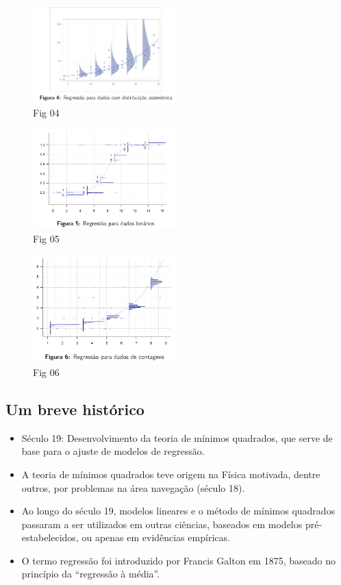 \documentclass[
]{article}
\providecommand{\tightlist}{%
  \setlength{\itemsep}{0pt}\setlength{\parskip}{0pt}}
\begin{document}
\begin{figure}
\centering
\includegraphics[width=0.5\textwidth,height=\textheight]{2024-08-10-fig4.png}
\caption{Fig 04}
\end{figure}

\begin{figure}
\centering
\includegraphics[width=0.5\textwidth,height=\textheight]{2024-08-10-fig5.png}
\caption{Fig 05}
\end{figure}

\begin{figure}
\centering
\includegraphics[width=0.5\textwidth,height=\textheight]{2024-08-10-fig6.png}
\caption{Fig 06}
\end{figure}

\subsection{Um breve histórico}\label{um-breve-histuxf3rico}

\begin{itemize}
\tightlist
\item
  Século 19: Desenvolvimento da teoria de mínimos quadrados, que serve
  de base para o ajuste de modelos de regressão.
\item
  A teoria de mínimos quadrados teve origem na Física motivada, dentre
  outros, por problemas na área navegação (século 18).
\item
  Ao longo do século 19, modelos lineares e o método de mínimos
  quadrados passaram a ser utilizados em outras ciências, baseados em
  modelos pré-estabelecidos, ou apenas em evidências empíricas.
\item
  O termo regressão foi introduzido por Francis Galton em 1875, baseado
  no princípio da ``regressão à média''.
\end{itemize}
\end{document}
